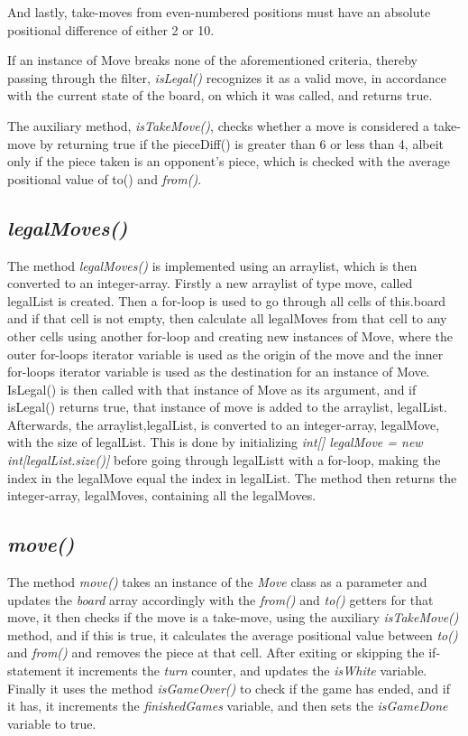 \documentclass[12pt, a4paper]{article}
\begin{document}
And lastly, take-moves from even-numbered positions must have an absolute positional difference of either 2 or 10. \par
If an instance of Move breaks none of the aforementioned criteria, thereby passing through the filter, \emph{isLegal()} recognizes it as a valid move, in accordance with the current state of the board, on which it was called, and returns true. \par
The auxiliary method, \emph{isTakeMove()}, checks whether a move is considered a take-move by returning true if the pieceDiff() is greater than 6 or less than 4, albeit only if the piece taken is an opponent's piece, which is checked with the average positional value of to() and \emph{from()}.

\subsection{\emph{legalMoves()}}
The method \emph{legalMoves()} is implemented using an arraylist, which is then converted to an integer-array. Firstly a new arraylist of type move, called legalList is created. Then a for-loop is used to go through all cells of this.board and if that cell is not empty, then calculate all legalMoves from that cell to any other cells using another for-loop and creating new instances of Move, where the outer for-loops iterator variable is used as the origin of the move and the inner for-loops iterator variable is used as the destination for an instance of Move. IsLegal() is then called with that instance of Move as its argument, and if isLegal() returns true, that instance of move is added to the arraylist, legalList. Afterwards, the arraylist,legalList, is converted to an integer-array, legalMove, with the size of legalList. This is done by initializing \emph{int[] legalMove = new int[legalList.size()]} before going through legalListt with a for-loop, making the index in the legalMove equal the index in legalList. The method then returns the integer-array, legalMoves, containing all the legalMoves.

\subsection{\emph{move()}}
The method \emph{move()} takes an instance of the \emph{Move} class as a parameter and updates the \emph{board} array accordingly with the \emph{from()} and \emph{to()} getters for that move, it then checks if the move is a take-move, using the auxiliary \emph{isTakeMove()} method, and if this is true, it calculates the average positional value between \emph{to()} and \emph{from()} and removes the piece at that cell.
After exiting or skipping the if-statement it increments the \emph{turn} counter, and updates the \emph{isWhite} variable. Finally it uses the method \emph{isGameOver()} to check if the game has ended, and if it has, it increments the \emph{finishedGames} variable, and then sets the \emph{isGameDone} variable to true.
\end{document}
